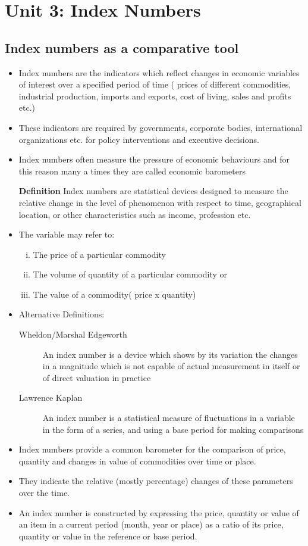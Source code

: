\documentclass[
10pt, %
a4paper, %
]{report}
\begin{document}
\chapter*{Unit 3: Index Numbers}

\section*{Index numbers as a comparative tool}
\begin{itemize}
\item Index numbers are the indicators which reflect changes in economic variables of interest over a specified period of time ( prices of different commodities, industrial production, imports and exports, cost of living, sales and profits etc.)
\item These indicators are required by governments, corporate bodies, international organizations etc. for policy interventions and executive decisions.
\item Index numbers often measure the pressure of economic behaviours and for this reason many a times they are called economic barometers
\item[\textbf{Definition}] Index numbers are statistical devices designed to measure the relative change in the level of phenomenon with respect to time, geographical location, or other characteristics such as income, profession etc.
\item The variable may refer to:
\begin{enumerate}[i.]
\item The price of a particular commodity
\item The volume of quantity of a particular commodity or
\item The value of a commodity( price x quantity)
\end{enumerate}
\item Alternative Definitions:
\begin{description}
\item[Wheldon/Marshal Edgeworth] An index number is a device which shows by its variation the changes in a magnitude which is not capable of actual measurement in itself or of direct valuation in practice
\item[Lawrence Kaplan] An index number is a statistical measure of fluctuations in a variable in the form of a series, and using a base period for making comparisons
\end{description}
\item Index numbers provide a common barometer for the comparison of price, quantity and changes in value of commodities over time or place.
\item They indicate the relative (mostly percentage) changes of these parameters over the time.
\item An index number is constructed by expressing the price, quantity or value of an item in a current period (month, year or place) as a ratio of its price, quantity or value in the reference or base period.
\end{itemize}
\end{document}
